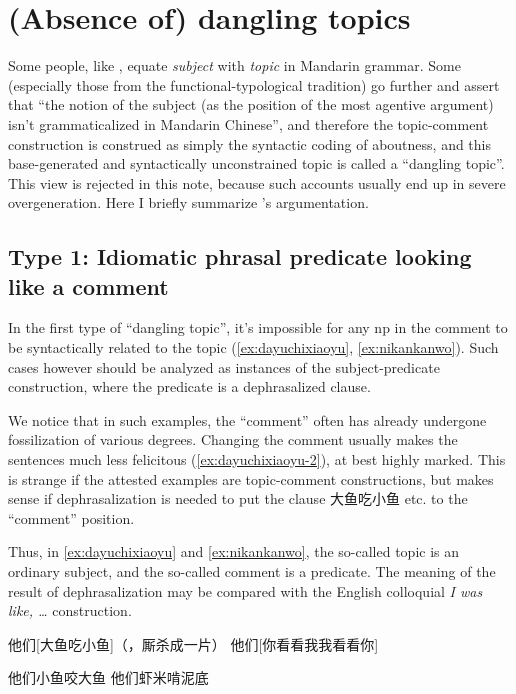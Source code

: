 \documentclass[UTF8, a4paper, oneside, scheme=plain, 12pt]{ctexrep}
\newcommand*{\citesec}[1]{\S~{#1}}
\newcommand*{\term}[1]{\emph{#1}}
\newcommand{\form}[1]{\emph{#1}}
\begin{document}
\section{(Absence of) dangling topics}\label{sec:topic-subject}

Some people, like \citet[\citesec{7.1}]{zhudexigrammar},
equate \term{subject} with \term{topic} in Mandarin grammar.
Some (especially those from the functional-typological tradition) go further 
and assert that ``the notion of the subject (as the position of the most agentive argument) 
isn't grammaticalized in Mandarin Chinese'',
and therefore the topic-comment construction 
is construed as simply the syntactic coding of aboutness,
and this base-generated and syntactically unconstrained topic 
is called a ``dangling topic''.
This view is rejected in this note,
because such accounts usually end up in severe overgeneration. 
Here I briefly summarize \citet{sih2000topic}'s argumentation.

\subsection{Type 1: Idiomatic phrasal predicate looking like a comment}\label{sec:clause.dangling-topic.1}

In the first type of ``dangling topic'',
it's impossible for any \acs{np} in the comment to be syntactically related to the topic
(\ref{ex:dayuchixiaoyu}, \ref{ex:nikankanwo}).
Such cases however should be analyzed as instances of the
subject-predicate construction,
where the predicate is a dephrasalized clause.

We notice that in such examples, 
the ``comment'' often has already undergone fossilization of various degrees.
Changing the comment usually makes the sentences much less felicitous 
(\ref{ex:dayuchixiaoyu-2}),
at best highly marked.
This is strange if the attested examples are topic-comment constructions,
but makes sense if dephrasalization is needed 
to put the clause 大鱼吃小鱼 etc. to the ``comment'' position.

Thus, in \eqref{ex:dayuchixiaoyu} and \eqref{ex:nikankanwo},
the so-called topic is an ordinary subject,
and the so-called comment is a predicate.
The meaning of the result of dephrasalization 
may be compared with the English colloquial 
\form{I was like, \dots} construction.

\begin{exe}
    \ex\label{ex:dayuchixiaoyu} 他们[大鱼吃小鱼]（，厮杀成一片）
    \ex\label{ex:nikankanwo} 他们[你看看我我看看你]
    
    \ex\label{ex:dayuchixiaoyu-2} \begin{xlist}
        \ex *他们小鱼咬大鱼 
        \ex *他们虾米啃泥底
    \end{xlist}
\end{exe}
\end{document}
